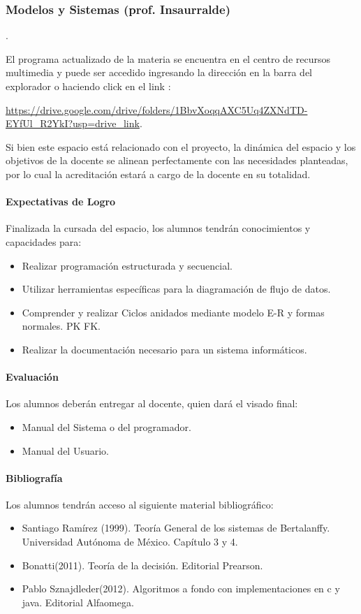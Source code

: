 \subsubsection{Modelos y Sistemas (prof. Insaurralde)}.

El programa actualizado de la materia se encuentra en el centro de recursos multimedia y puede ser accedido ingresando la dirección en la barra del explorador o haciendo click en el link :


\url{https://drive.google.com/drive/folders/1BbvXoqqAXC5Uq4ZXNdTD-EYfUl_R2YkI?usp=drive_link}.


Si bien este espacio está relacionado con el proyecto, la dinámica del espacio y los objetivos de la docente se alinean perfectamente con las necesidades planteadas, por lo cual la acreditación estará a cargo de la docente en su totalidad.

\paragraph{Expectativas de Logro} Finalizada la cursada del espacio, los alumnos tendrán conocimientos y capacidades para:

\begin{itemize}
    \item Realizar programación estructurada y secuencial. 
    \item Utilizar herramientas específicas para la diagramación de flujo de datos.
    \item Comprender y realizar Ciclos anidados mediante modelo E-R y formas normales. PK FK.
    \item Realizar la documentación necesario para un sistema informáticos.
\end{itemize}

\paragraph{Evaluación} Los alumnos deberán entregar al docente, quien dará el visado final:
\begin{itemize}
    \item Manual del Sistema o del programador.
    \item Manual del Usuario.
\end{itemize}

\paragraph{Bibliografía} Los alumnos tendrán acceso al siguiente material bibliográfico:

\begin{itemize}
    \item Santiago Ramírez (1999). Teoría General de los sistemas de Bertalanffy. Universidad Autónoma de México. Capítulo 3 y 4.
    \item Bonatti(2011). Teoría de la decisión. Editorial Prearson.
    \item Pablo Sznajdleder(2012). Algoritmos a fondo con implementaciones en c y java. Editorial Alfaomega.
\end{itemize}
